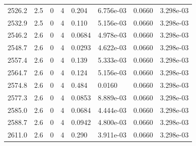 \documentclass[preview]{standalone}
\begin{document}
{{{{{{{{{{{{\begin{tabular}{L{1.2cm}C{1.2cm} C{0.3cm}C{0.5cm} C{1.4cm}C{1.4cm} C{1.4cm}C{1.4cm}}
  2526.2  &   2.5  & 0     &  4 &  0.204  & 6.756e-03  & 0.0660 &  3.298e-03   \\ 
  2532.9  &   2.5  & 0     &  4 &  0.110  & 5.156e-03  & 0.0660 &  3.298e-03   \\ 
  2546.2  &   2.6  & 0     &  4 &  0.0684  & 4.978e-03  & 0.0660 &  3.298e-03   \\ 
  2548.7  &   2.6  & 0     &  4 &  0.0293  & 4.622e-03  & 0.0660 &  3.298e-03   \\ 
  2557.4  &   2.6  & 0     &  4 &  0.139  & 5.333e-03  & 0.0660 &  3.298e-03   \\ 
  2564.7  &   2.6  & 0     &  4 &  0.124  & 5.156e-03  & 0.0660 &  3.298e-03   \\ 
  2574.8  &   2.6  & 0     &  4 &  0.484  & 0.0160  & 0.0660 &  3.298e-03   \\ 
  2577.3  &   2.6  & 0     &  4 &  0.0853  & 8.889e-03  & 0.0660 &  3.298e-03   \\ 
  2585.0  &   2.6  & 0     &  4 &  0.0684  & 4.444e-03  & 0.0660 &  3.298e-03   \\ 
  2588.7  &   2.6  & 0     &  4 &  0.0942  & 4.800e-03  & 0.0660 &  3.298e-03   \\ 
  2611.0  &   2.6  & 0     &  4 &  0.290  & 3.911e-03  & 0.0660 &  3.298e-03   \\ 
\hline 
\end{tabular} 

}}}}}}}}}}}}
\end{document}
